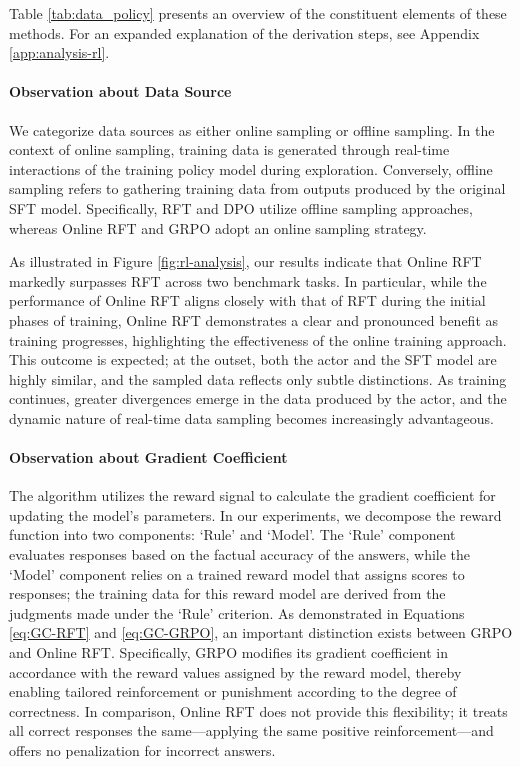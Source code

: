 \begin{itemize}[topsep=0pt]
\begin{itemize}[topsep=0pt]
Table \ref{tab:data_policy} presents an overview of the constituent elements of these methods. For an expanded explanation of the derivation steps, see Appendix \ref{app:analysis-rl}.

\paragraph{Observation about Data Source} We categorize data sources as either online sampling or offline sampling. In the context of online sampling, training data is generated through real-time interactions of the training policy model during exploration. Conversely, offline sampling refers to gathering training data from outputs produced by the original SFT model. Specifically, RFT and DPO utilize offline sampling approaches, whereas Online RFT and GRPO adopt an online sampling strategy.

As illustrated in Figure \ref{fig:rl-analysis}, our results indicate that Online RFT markedly surpasses RFT across two benchmark tasks. In particular, while the performance of Online RFT aligns closely with that of RFT during the initial phases of training, Online RFT demonstrates a clear and pronounced benefit as training progresses, highlighting the effectiveness of the online training approach. This outcome is expected; at the outset, both the actor and the SFT model are highly similar, and the sampled data reflects only subtle distinctions. As training continues, greater divergences emerge in the data produced by the actor, and the dynamic nature of real-time data sampling becomes increasingly advantageous.

\paragraph{Observation about Gradient Coefficient} The algorithm utilizes the reward signal to calculate the gradient coefficient for updating the model’s parameters. In our experiments, we decompose the reward function into two components: `Rule' and `Model'. The `Rule' component evaluates responses based on the factual accuracy of the answers, while the `Model' component relies on a trained reward model that assigns scores to responses; the training data for this reward model are derived from the judgments made under the `Rule' criterion. As demonstrated in Equations \ref{eq:GC-RFT} and \ref{eq:GC-GRPO}, an important distinction exists between GRPO and Online RFT. Specifically, GRPO modifies its gradient coefficient in accordance with the reward values assigned by the reward model, thereby enabling tailored reinforcement or punishment according to the degree of correctness. In comparison, Online RFT does not provide this flexibility; it treats all correct responses the same—applying the same positive reinforcement—and offers no penalization for incorrect answers.


\end{itemize}
\end{itemize}
